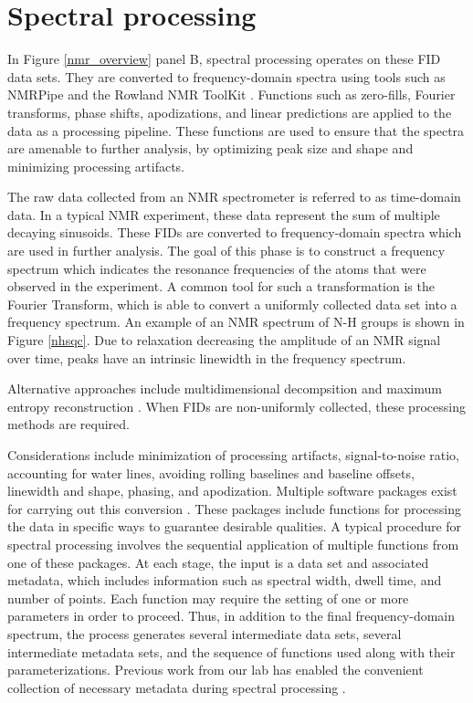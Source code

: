 \section{Spectral processing}

In Figure \ref{nmr_overview} panel B, 
spectral processing operates on these FID data sets.  They are 
converted to frequency-domain spectra using tools such as NMRPipe \cite{nmrpipe}
and the Rowland NMR ToolKit \cite{rnmrtk}.  Functions such as 
zero-fills, Fourier transforms, phase shifts, apodizations, and linear 
predictions are applied to the data as a processing pipeline.  These 
functions are used to ensure that the spectra are amenable to further 
analysis, by optimizing peak size and shape and minimizing processing 
artifacts.

The raw data collected from an NMR spectrometer is referred to as 
time-domain data.  In a typical NMR experiment, these data represent the 
sum of multiple decaying sinusoids.  These FIDs are converted to 
frequency-domain spectra which are used in further analysis.  The goal of 
this phase is to construct a frequency spectrum which indicates the resonance 
frequencies of the atoms that were observed in the experiment.  A common tool 
for such a transformation is the Fourier Transform, which is able to convert 
a uniformly collected data set into a frequency spectrum.  
An example of an NMR spectrum of N-H groups is shown in Figure \ref{nhsqc}.
Due to relaxation decreasing the amplitude of an NMR signal over time, peaks 
have an intrinsic linewidth in the frequency spectrum.

Alternative approaches include multidimensional decompsition \cite{mdd}
and maximum entropy reconstruction \cite{hoch1996nmr}.  When FIDs are 
non-uniformly collected, these processing methods are required.

Considerations include minimization of processing artifacts, signal-to-noise 
ratio, accounting for water lines, avoiding rolling baselines and baseline 
offsets, linewidth and shape, phasing, and apodization.  Multiple software 
packages exist for carrying out this conversion \cite{nmrpipe, rnmrtk}.
These packages include functions for processing the data in specific ways to 
guarantee desirable qualities.  A typical procedure for spectral processing 
involves the sequential application of multiple functions from one of these 
packages.  At each stage, the input is a data set and associated metadata, 
which includes information such as spectral width, dwell time, and number of 
points.  Each function may require the setting of one or more parameters in 
order to proceed.  Thus, in addition to the final frequency-domain spectrum, 
the process generates several intermediate data sets, several 
intermediate metadata sets, and the sequence of functions used along with 
their parameterizations.  Previous work from our lab has enabled the 
convenient collection of necessary metadata during spectral 
processing \cite{connjur-wb}.



